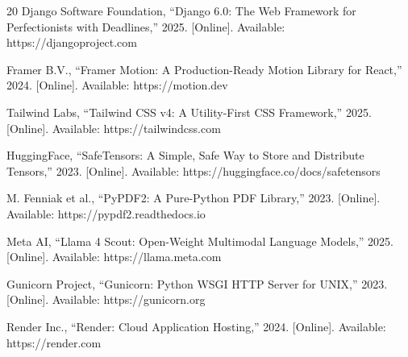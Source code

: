 \documentclass[conference]{IEEEtran}
\begin{document}
\begin{thebibliography}{20}
Django Software Foundation, ``Django 6.0: The Web Framework for Perfectionists with Deadlines,'' 2025. [Online]. Available: https://djangoproject.com

Framer B.V., ``Framer Motion: A Production-Ready Motion Library for React,'' 2024. [Online]. Available: https://motion.dev

Tailwind Labs, ``Tailwind CSS v4: A Utility-First CSS Framework,'' 2025. [Online]. Available: https://tailwindcss.com

HuggingFace, ``SafeTensors: A Simple, Safe Way to Store and Distribute Tensors,'' 2023. [Online]. Available: https://huggingface.co/docs/safetensors

M. Fenniak et al., ``PyPDF2: A Pure-Python PDF Library,'' 2023. [Online]. Available: https://pypdf2.readthedocs.io

Meta AI, ``Llama 4 Scout: Open-Weight Multimodal Language Models,'' 2025. [Online]. Available: https://llama.meta.com

Gunicorn Project, ``Gunicorn: Python WSGI HTTP Server for UNIX,'' 2023. [Online]. Available: https://gunicorn.org

Render Inc., ``Render: Cloud Application Hosting,'' 2024. [Online]. Available: https://render.com

\end{thebibliography}
\end{document}
